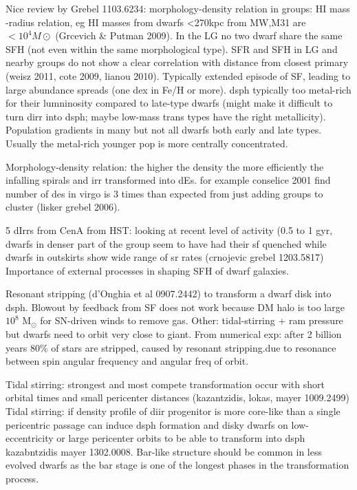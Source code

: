 \documentclass[12pt,preprint]{aastex}
\begin{document}
Nice review by Grebel 1103.6234: morphology-density relation in groups: HI mass -radius relation, eg HI masses from dwarfs <270kpc from MW,M31 are
 $<10^4 M\odot$ (Grcevich \& Putman 2009). In the LG no two dwarf share the same SFH (not even within the same morphological type). SFR and SFH in 
 LG and nearby groups do not show a clear correlation with distance from closest primary (weisz 2011, cote 2009, lianou 2010). Typically extended episode 
of SF, leading to large abundance spreads (one dex in Fe/H or more). dsph typically too metal-rich for their lumninosity compared to late-type dwarfs (might 
make it difficult to turn dirr into dsph; maybe low-mass trans types have the right metallicity). Population gradients in many but not all dwarfs both early and 
late types. Usually the metal-rich younger pop is more centrally concentrated.

Morphology-density relation: the higher the density the more efficiently the infalling spirals and irr transformed into dEs. for example conselice 2001 find 
number of des in virgo is 3 times than expected from just adding groups to cluster (lisker grebel 2006).

5 dIrrs from CenA from HST: looking at recent level of activity (0.5 to 1 gyr, dwarfs in denser part of the group seem to have had their sf quenched while 
dwarfs in outskirts show wide range of sr rates (crnojevic grebel 1203.5817) Importance of external processes in shaping SFH of dwarf galaxies.

Resonant stripping (d'Onghia et al 0907.2442) to transform a dwarf disk into dsph. Blowout by feedback from SF does not work because DM halo is too 
large $10^8$ M$_\odot$ for SN-driven winds to remove gas. Other: tidal-stirring + ram pressure but dwarfs need to orbit very close to giant. From numerical 
exp: after 2 billion years 80\% of stars are stripped, caused by resonant stripping.due to resonance between spin angular frequency and angular freq of orbit.

Tidal stirring: strongest and most compete transformation occur with short orbital times and small pericenter distances (kazantzidis, lokas, mayer 1009.2499)
Tidal stirring: if density profile of diir progenitor is more core-like than a single pericentric passage can induce dsph formation and disky dwarfs on low-eccentricity 
or large pericenter orbits to be able to transform into dsph kazabntzidis mayer 1302.0008. Bar-like structure should be common in less evolved dwarfs as the
bar stage is one of the longest phases in the transformation process.
\end{document}
